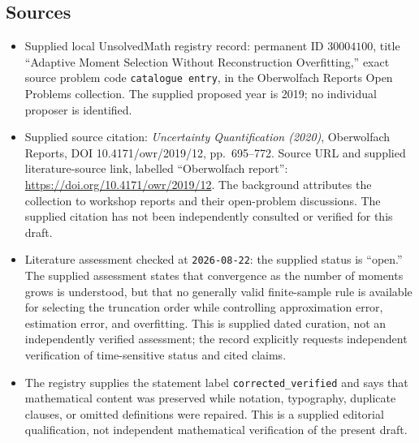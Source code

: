 \documentclass[11pt]{article}
\begin{document}
\subsection{Sources}
\begin{itemize}
\item Supplied local UnsolvedMath registry record: permanent ID \(30004100\), title ``Adaptive Moment Selection Without Reconstruction Overfitting,'' exact source problem code \texttt{catalogue entry}, in the Oberwolfach Reports Open Problems collection. The supplied proposed year is 2019; no individual proposer is identified.
\item Supplied source citation: \emph{Uncertainty Quantification (2020)}, Oberwolfach Reports, DOI 10.4171/owr/2019/12, pp.\ 695--772. Source URL and supplied literature-source link, labelled ``Oberwolfach report'': \url{https://doi.org/10.4171/owr/2019/12}. The background attributes the collection to workshop reports and their open-problem discussions. The supplied citation has not been independently consulted or verified for this draft.
\item Literature assessment checked at \texttt{2026-08-22}: the supplied status is ``open.'' The supplied assessment states that convergence as the number of moments grows is understood, but that no generally valid finite-sample rule is available for selecting the truncation order while controlling approximation error, estimation error, and overfitting. This is supplied dated curation, not an independently verified assessment; the record explicitly requests independent verification of time-sensitive status and cited claims.
\item The registry supplies the statement label \texttt{corrected\_verified} and says that mathematical content was preserved while notation, typography, duplicate clauses, or omitted definitions were repaired. This is a supplied editorial qualification, not independent mathematical verification of the present draft.
\end{itemize}
\end{document}
